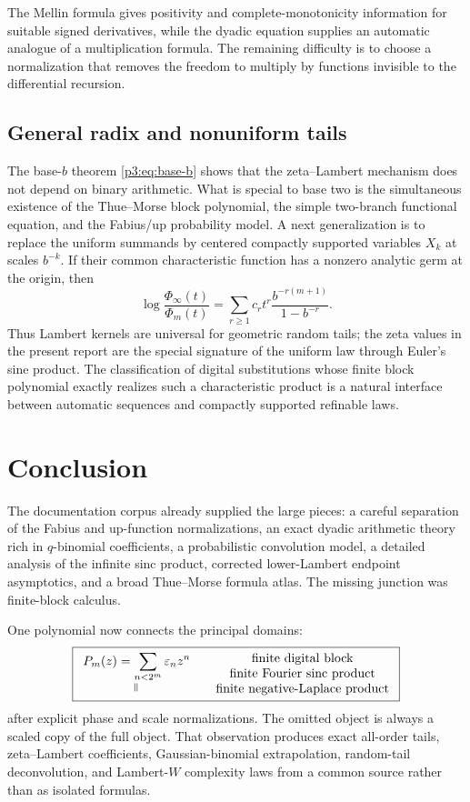 \documentclass[11pt,oneside]{article}
\numberwithin{equation}{section}
\theoremstyle{definition}
\theoremstyle{remark}
\newcommand{\eps}{\varepsilon}
\begin{document}
The Mellin formula gives positivity and complete-monotonicity information for suitable signed
derivatives, while the dyadic equation supplies an automatic analogue of a multiplication
formula.  The remaining difficulty is to choose a normalization that removes the freedom to
multiply by functions invisible to the differential recursion.

\subsection{General radix and nonuniform tails}

The base-$b$ theorem \eqref{p3:eq:base-b} shows that the zeta--Lambert mechanism does not depend
on binary arithmetic.  What is special to base two is the simultaneous existence of the
Thue--Morse block polynomial, the simple two-branch functional equation, and the Fabius/up
probability model.  A next generalization is to replace the uniform summands by centered
compactly supported variables $X_k$ at scales $b^{-k}$.  If their common characteristic
function has a nonzero analytic germ at the origin, then
\[
 \log\frac{\Phi_\infty(t)}{\Phi_m(t)}
 =\sum_{r\ge1}c_r t^r\frac{b^{-r(m+1)}}{1-b^{-r}}.
\]
Thus Lambert kernels are universal for geometric random tails; the zeta values in the present
report are the special signature of the uniform law through Euler's sine product.  The
classification of digital substitutions whose finite block polynomial exactly realizes such
a characteristic product is a natural interface between automatic sequences and compactly
supported refinable laws.

\section{Conclusion}
\label{p3:sec:conclusion}

The documentation corpus already supplied the large pieces: a careful separation of the
Fabius and up-function normalizations, an exact dyadic arithmetic theory rich in
$q$-binomial coefficients, a probabilistic convolution model, a detailed analysis of the
infinite sinc product, corrected lower-Lambert endpoint asymptotics, and a broad Thue--Morse
formula atlas.  The missing junction was finite-block calculus.

One polynomial now connects the principal domains:
\[
 \boxed{
 \begin{array}{c}
 P_m(z)=\displaystyle\sum_{n<2^m}\eps_nz^n\\[0.3em]
 \rotatebox{90}{$=$}
 \end{array}
 \quad
 \begin{array}{c}
 \text{finite digital block}\\
 \text{finite Fourier sinc product}\\
 \text{finite negative-Laplace product}
 \end{array}}
\]
after explicit phase and scale normalizations.  The omitted object is always a scaled copy of
the full object.  That observation produces exact all-order tails, zeta--Lambert coefficients,
Gaussian-binomial extrapolation, random-tail deconvolution, and Lambert-$W$ complexity laws
from a common source rather than as isolated formulas.
\end{document}
